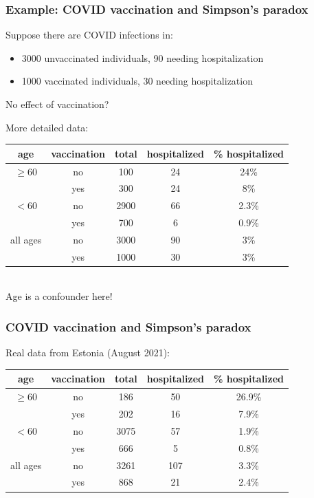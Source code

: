\documentclass[10pt,dvipsnames,t %
,aspectratio=169%
]{beamer}%
\begin{document}
\begin{frame}
	\frametitle{Example: COVID vaccination and Simpson's paradox}
\begin{block}{Suppose there are COVID infections in:}
\begin{itemize}
\item 3000 unvaccinated individuals, 90 needing hospitalization
\item 1000 vaccinated individuals, 30 needing hospitalization
\end{itemize}
\alert{No effect of vaccination?} 
\end{block} 
\pause 
	More detailed data: \\[0.2cm]
\begin{tabular}{|c|c|c|c|c|}
	\hline 
	age & vaccination & total & hospitalized & \% hospitalized \\
	\hline  
	$\ge 60$  & no & 100 & 24 & 24\% \\
	& yes & 300 & 24 & 8\% \\
	\hline 
	$<60$  & no & 2900 & 66 & 2.3\% \\
	& yes & 700 & 6 & 0.9\% \\
	\hline 
	all ages & no & 3000 & 90 & 3\% \\
	& yes & 1000 & 30 & 3\% \\
	\hline 	
\end{tabular}
\mbox{}\\[0.2cm]

	\alert{Age is a confounder here!}

\end{frame}

\begin{frame}
	\frametitle{COVID vaccination and Simpson's paradox}
	Real data from Estonia (August 2021): \\[0.2cm]
	\begin{tabular}{|c|c|c|c|c|}
		\hline 
		age & vaccination & total & hospitalized & \% hospitalized \\
		\hline  
	$\ge 60$  & no & 186 & 50 & 26.9\% \\
          & yes & 202 & 16 & 7.9\% \\
	\hline 
	$<60$  & no & 3075 & 57 & 1.9\% \\
	       & yes & 666 & 5 & 0.8\% \\
	\hline 
    all ages & no & 3261 & 107 & 3.3\% \\
               & yes & 868 & 21 & 2.4\% \\
\hline 	
\end{tabular}
\mbox{}\\
\end{frame}
\end{document}
